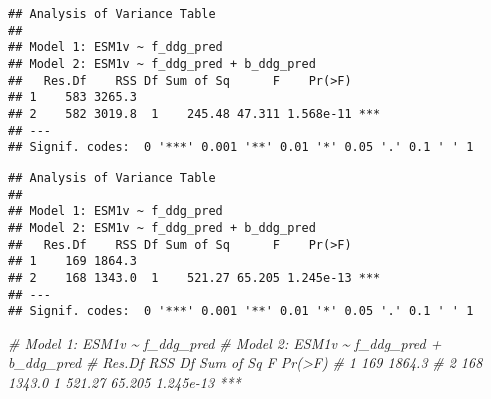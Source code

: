 \documentclass[
]{article}
\newenvironment{Shaded}{\begin{snugshade}}{\end{snugshade}}
\newcommand{\CommentTok}[1]{\textcolor[rgb]{0.56,0.35,0.01}{\textit{#1}}}
\newcommand{\FunctionTok}[1]{\textcolor[rgb]{0.13,0.29,0.53}{\textbf{#1}}}
\newcommand{\NormalTok}[1]{#1}
\newcommand{\SpecialCharTok}[1]{\textcolor[rgb]{0.81,0.36,0.00}{\textbf{#1}}}
\begin{document}
\begin{verbatim}
## Analysis of Variance Table
## 
## Model 1: ESM1v ~ f_ddg_pred
## Model 2: ESM1v ~ f_ddg_pred + b_ddg_pred
##   Res.Df    RSS Df Sum of Sq      F    Pr(>F)    
## 1    583 3265.3                                  
## 2    582 3019.8  1    245.48 47.311 1.568e-11 ***
## ---
## Signif. codes:  0 '***' 0.001 '**' 0.01 '*' 0.05 '.' 0.1 ' ' 1
\end{verbatim}

\begin{Shaded}
\end{Shaded}

\begin{verbatim}
## Analysis of Variance Table
## 
## Model 1: ESM1v ~ f_ddg_pred
## Model 2: ESM1v ~ f_ddg_pred + b_ddg_pred
##   Res.Df    RSS Df Sum of Sq      F    Pr(>F)    
## 1    169 1864.3                                  
## 2    168 1343.0  1    521.27 65.205 1.245e-13 ***
## ---
## Signif. codes:  0 '***' 0.001 '**' 0.01 '*' 0.05 '.' 0.1 ' ' 1
\end{verbatim}

\begin{Shaded}
\begin{Highlighting}[]
\CommentTok{\# Model 1: ESM1v \textasciitilde{} f\_ddg\_pred}
\CommentTok{\# Model 2: ESM1v \textasciitilde{} f\_ddg\_pred + b\_ddg\_pred}
\CommentTok{\#   Res.Df    RSS Df Sum of Sq      F    Pr(\textgreater{}F)    }
\CommentTok{\# 1    169 1864.3                                  }
\CommentTok{\# 2    168 1343.0  1    521.27 65.205 1.245e{-}13 ***}
\end{Highlighting}
\end{Shaded}
\end{document}
